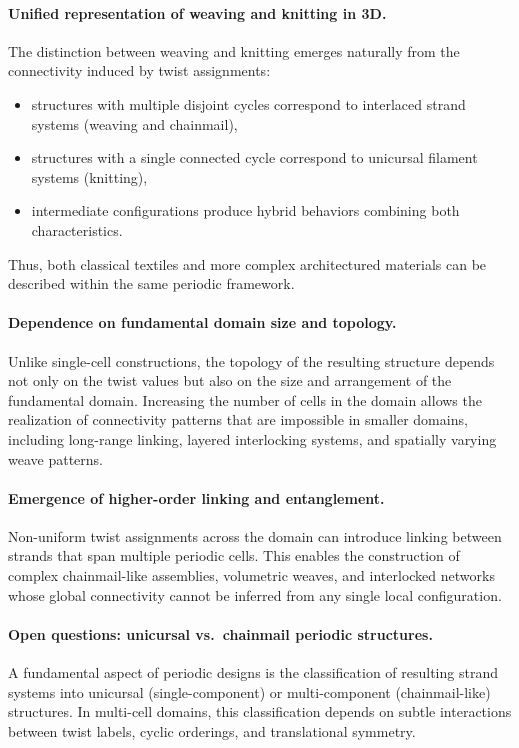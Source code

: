 \documentclass[acmtog,anonymous,review]{acmart}
\begin{document}
\paragraph{Unified representation of weaving and knitting in 3D.}
The distinction between weaving and knitting emerges naturally from the connectivity induced by twist assignments:
\begin{itemize}
    \item structures with multiple disjoint cycles correspond to interlaced strand systems (weaving and chainmail),
    \item structures with a single connected cycle correspond to unicursal filament systems (knitting),
    \item intermediate configurations produce hybrid behaviors combining both characteristics.
\end{itemize}
Thus, both classical textiles and more complex architectured materials can be described within the same periodic framework.

\paragraph{Dependence on fundamental domain size and topology.}
Unlike single-cell constructions, the topology of the resulting structure depends not only on the twist values but also on the size and arrangement of the fundamental domain. Increasing the number of cells in the domain allows the realization of connectivity patterns that are impossible in smaller domains, including long-range linking, layered interlocking systems, and spatially varying weave patterns.

\paragraph{Emergence of higher-order linking and entanglement.}
Non-uniform twist assignments across the domain can introduce linking between strands that span multiple periodic cells. This enables the construction of complex chainmail-like assemblies, volumetric weaves, and interlocked networks whose global connectivity cannot be inferred from any single local configuration.

\paragraph{Open questions: unicursal vs.\ chainmail periodic structures.}
A fundamental aspect of periodic designs is the classification of resulting strand systems into unicursal (single-component) or multi-component (chainmail-like) structures. In multi-cell domains, this classification depends on subtle interactions between twist labels, cyclic orderings, and translational symmetry.
\end{document}
